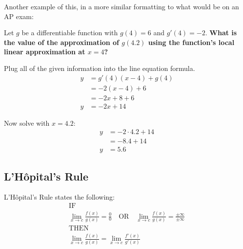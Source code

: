 \documentclass[12pt]{article}
\begin{document}
            Another example of this, in a more similar formatting to what would be on an AP exam:

            \noindent Let $g$ be a differentiable function with $g(4) = 6$ and $g'(4) = -2$. \textbf{What is the value of the approximation of $g(4.2)$ using the function's local linear approximation at $x=4$?}

            \begin{center}
                Plug all of the given information into the line equation formula.
                \begin{align*}
                    y &= g'(4)(x-4) + g(4) \\
                    &= -2(x-4) + 6 \\
                    &= -2x + 8 + 6 \\
                    y &= -2x + 14
                \end{align*}

                Now solve with $x=4.2$:
                \begin{align*}
                    y &= -2 \cdot 4.2 + 14 \\
                    &= -8.4 + 14 \\
                    y &= 5.6
                \end{align*}
            \end{center}

        \subsection{L'Hôpital's Rule} %
            \noindent L'Hôpital's Rule states the following:
            \begin{gather*}
                \text{IF} \\
                \lim_{x \to c} \frac{f(x)}{g(x)} = \frac{0}{0} \quad \text{OR} \quad \lim_{x \to c} \frac{f(x)}{g(x)} = \frac{\pm \infty}{\pm \infty} \\[6pt]
                \text{THEN} \\
                \lim_{x \to c} \frac{f(x)}{g(x)} = \lim_{x \to c} \frac{f'(x)}{g'(x)}
            \end{gather*}
\end{document}
